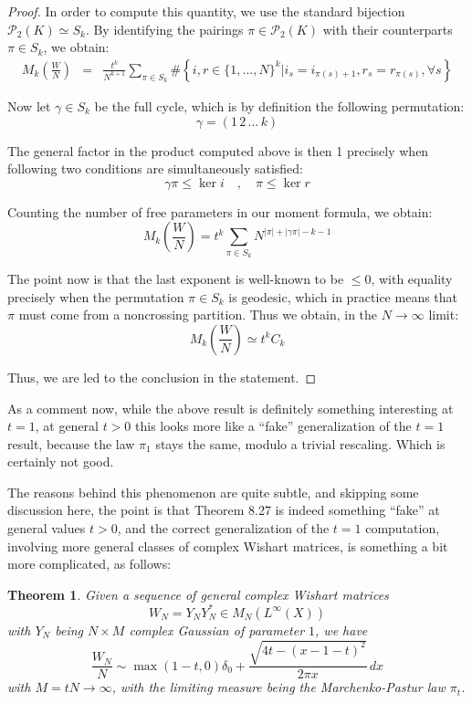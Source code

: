 \documentclass[12pt]{amsbook}
\newtheorem{theorem}{Theorem}[chapter]
\begin{document}
\begin{proof}
In order to compute this quantity, we use the standard bijection $\mathcal P_2(K)\simeq S_k$. By identifying the pairings $\pi\in\mathcal P_2(K)$ with their counterparts $\pi\in S_k$, we obtain:
\begin{eqnarray*}
M_k\left(\frac{W}{N}\right)
&=&\frac{t^k}{N^{k+1}}\sum_{\pi\in S_k}\#\left\{i,r\in\{1,\ldots,N\}^k\Big|i_s=i_{\pi(s)+1},r_s=r_{\pi(s)},\forall s\right\}
\end{eqnarray*}

Now let $\gamma\in S_k$ be the full cycle, which is by definition the following permutation:
$$\gamma=(1 \, 2 \, \ldots \, k)$$

The general factor in the product computed above is then 1 precisely when following two conditions are simultaneously satisfied:
$$\gamma\pi\leq\ker i\quad,\quad 
\pi\leq\ker r$$

Counting the number of free parameters in our moment formula, we obtain:
$$M_k\left(\frac{W}{N}\right)
=t^k\sum_{\pi\in S_k}N^{|\pi|+|\gamma\pi|-k-1}$$

The point now is that the last exponent is well-known to be $\leq 0$, with equality precisely when the permutation $\pi\in S_k$ is geodesic, which in practice means that $\pi$ must come from a noncrossing partition. Thus we obtain, in the $N\to\infty$ limit:
$$M_k\left(\frac{W}{N}\right)\simeq t^kC_k$$

Thus, we are led to the conclusion in the statement.
\end{proof}

As a comment now, while the above result is definitely something interesting at $t=1$, at general $t>0$ this looks more like a ``fake'' generalization of the $t=1$ result, because the law $\pi_1$ stays the same, modulo a trivial rescaling. Which is certainly not good.

\bigskip

The reasons behind this phenomenon are quite subtle, and skipping some discussion here, the point is that Theorem 8.27 is indeed something ``fake'' at general values $t>0$, and the correct generalization of the $t=1$ computation, involving more general classes of complex Wishart matrices, is something a bit more complicated, as follows:

\begin{theorem}
Given a sequence of general complex Wishart matrices
$$W_N=Y_NY_N^*\in M_N(L^\infty(X))$$
with $Y_N$ being $N\times M$ complex Gaussian of parameter $1$, we have
$$\frac{W_N}{N}\sim\max(1-t,0)\delta_0+\frac{\sqrt{4t-(x-1-t)^2}}{2\pi x}\,dx$$
with $M=tN\to\infty$, with the limiting measure being the Marchenko-Pastur law $\pi_t$.
\end{theorem}
\end{document}
